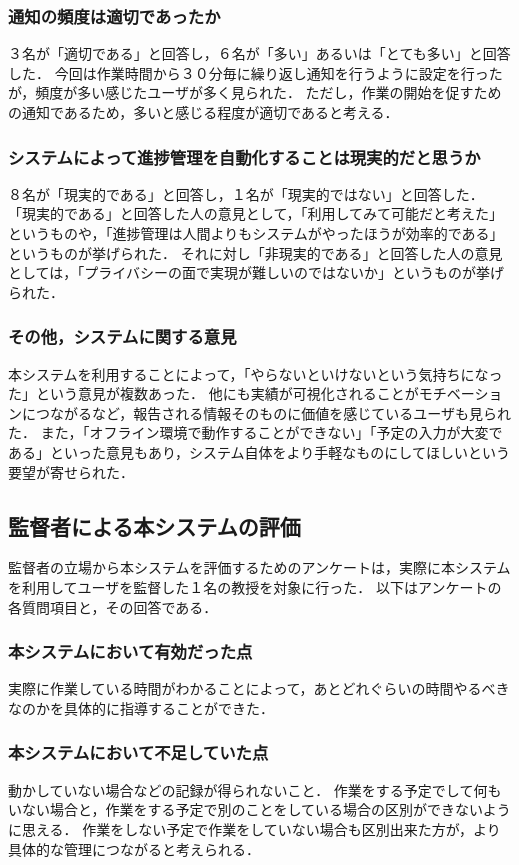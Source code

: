 \subsubsection{通知の頻度は適切であったか}
３名が「適切である」と回答し，６名が「多い」あるいは「とても多い」と回答した．
今回は作業時間から３０分毎に繰り返し通知を行うように設定を行ったが，頻度が多い感じたユーザが多く見られた．
ただし，作業の開始を促すための通知であるため，多いと感じる程度が適切であると考える．

\subsubsection{システムによって進捗管理を自動化することは現実的だと思うか}
８名が「現実的である」と回答し，１名が「現実的ではない」と回答した．
「現実的である」と回答した人の意見として，「利用してみて可能だと考えた」というものや，「進捗管理は人間よりもシステムがやったほうが効率的である」というものが挙げられた．
それに対し「非現実的である」と回答した人の意見としては，「プライバシーの面で実現が難しいのではないか」というものが挙げられた．

\subsubsection{その他，システムに関する意見}
本システムを利用することによって，「やらないといけないという気持ちになった」という意見が複数あった．
他にも実績が可視化されることがモチベーションにつながるなど，報告される情報そのものに価値を感じているユーザも見られた．
また，「オフライン環境で動作することができない」「予定の入力が大変である」といった意見もあり，システム自体をより手軽なものにしてほしいという要望が寄せられた．

\subsection{監督者による本システムの評価}
監督者の立場から本システムを評価するためのアンケートは，実際に本システムを利用してユーザを監督した１名の教授を対象に行った．
以下はアンケートの各質問項目と，その回答である．

\subsubsection{本システムにおいて有効だった点}
実際に作業している時間がわかることによって，あとどれぐらいの時間やるべきなのかを具体的に指導することができた．

\subsubsection{本システムにおいて不足していた点}
動かしていない場合などの記録が得られないこと．
作業をする予定でして何もいない場合と，作業をする予定で別のことをしている場合の区別ができないように思える．
作業をしない予定で作業をしていない場合も区別出来た方が，より具体的な管理につながると考えられる．

